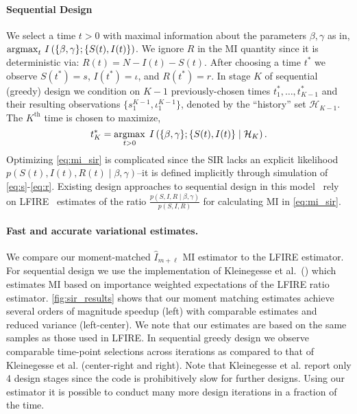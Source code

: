 \paragraph{Sequential Design} We select a time $t > 0$ with maximal
information about the parameters $\beta, \gamma$ as in, \mbox{$\operatorname*{argmax}_t \, I\left(\{\beta, \gamma\} ; \{S(t),
I(t)\} \right)$}.
We ignore $R$ in the MI quantity since it is deterministic via: $R(t)
= N - I(t) - S(t)$.  After choosing a time $t^*$ we observe $S(t^*) =
s$, $I(t^*) = \iota$, and $R(t^*) = r$.  In stage $K$ of sequential
(greedy) design we condition on $K-1$ previously-chosen times $t^*_1,
\ldots, t^*_{K-1}$ and their resulting observations $\{s_1^{K-1},
\iota_1^{K-1}\}$, denoted by the ``history'' set $\mathcal{H}_{K-1}$.  The
$K^{\text{th}}$ time is chosen to maximize,
\begin{equation}\label{eq:mi_sir}
  t_K^* = \operatorname*{argmax}_{t > 0} \; I\left(\{\beta, \gamma\} ; \{S(t),
  I(t)\} \mid \mathcal{H}_K \right).
\end{equation}
Optimizing \EQN\eqref{eq:mi_sir} is complicated since the SIR lacks an
explicit likelihood \mbox{$p(S(t), I(t), R(t) \mid \beta, \gamma)$}--it is
defined implicitly through simulation of
\EQNS\eqref{eq:s}-\eqref{eq:r}.  Existing design approaches to
sequential design in this model~\cite{kleinegesse2021sequential} rely
on LFIRE~\cite{thomas2022likelihood} estimates of the ratio
$\frac{p(S, I, R \mid \beta, \gamma)}{p(S, I, R)}$ for calculating MI
in \EQN\eqref{eq:mi_sir}.

\paragraph{Fast and accurate variational estimates.} We compare our moment-matched
$\hat{I}_{m+\ell}$ MI estimator to the LFIRE estimator.  For
sequential design we use the implementation of Kleinegesse et
al.~(\citeyear{kleinegesse2021sequential}) which estimates MI based on
importance weighted expectations of the LFIRE ratio estimator.
\FIG\ref{fig:sir_results} shows that our moment matching estimates
achieve several orders of magnitude speedup (left) with comparable
estimates and reduced variance (left-center).  We note that our
estimates are based on the same samples as those used in LFIRE.  In
sequential greedy design we observe comparable time-point selections
across iterations as compared to that of Kleinegesse et
al. (center-right and right).  Note that Kleinegesse et al. report
only 4 design stages since the code is prohibitively slow for further
designs.  Using our estimator it is possible to conduct many more
design iterations in a fraction of the time.





